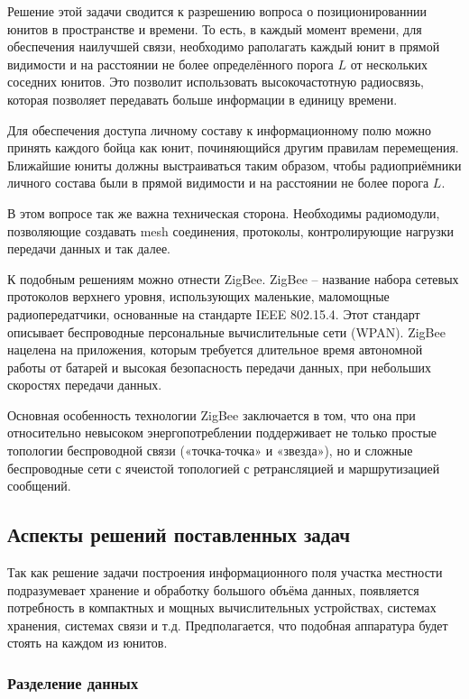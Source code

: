 Решение этой задачи сводится к разрешению вопроса о позиционированнии юнитов
в пространстве и времени. То есть, в каждый момент времени, для обеспечения 
наилучшей связи, необходимо раполагать каждый юнит в прямой видимости и 
на расстоянии не более определённого порога $L$ от нескольких соседних юнитов.
Это позволит использовать высокочастотную радиосвязь, которая позволяет
передавать больше информации в единицу времени.

Для обеспечения доступа личному составу к информационному полю можно принять
каждого бойца как юнит, починяющийся другим правилам перемещения. Ближайшие
юниты должны выстраиваться таким образом, чтобы радиоприёмники личного состава
были в прямой видимости и на расстоянии не более порога $L$.

В этом вопросе так же важна техническая сторона. Необходимы радиомодули,
позволяющие создавать mesh соединения, протоколы, контролирующие нагрузки
передачи данных и так далее.

К подобным решениям можно отнести ZigBee.
ZigBee -- название набора сетевых протоколов верхнего уровня,
использующих маленькие, маломощные радиопередатчики, основанные на
стандарте IEEE 802.15.4. Этот стандарт описывает беспроводные персональные
вычислительные сети (WPAN). ZigBee нацелена на приложения, которым
требуется длительное время автономной работы от батарей и высокая
безопасность передачи данных, при небольших скоростях передачи данных.

Основная особенность технологии ZigBee заключается в том, что она при
относительно невысоком энергопотреблении поддерживает не только простые
топологии беспроводной связи («точка-точка» и «звезда»), но и сложные
беспроводные сети с ячеистой топологией с ретрансляцией и маршрутизацией
сообщений.

\newpage
\subsection{Аспекты решений поставленных задач} 

Так как решение задачи построения информационного поля
участка местности подразумевает хранение и обработку большого объёма
данных, появляется потребность в компактных и мощных вычислительных
устройствах, системах хранения, системах связи и т.д. 
Предполагается, что подобная аппаратура будет
стоять на каждом из юнитов.

\subsubsection{Разделение данных}

